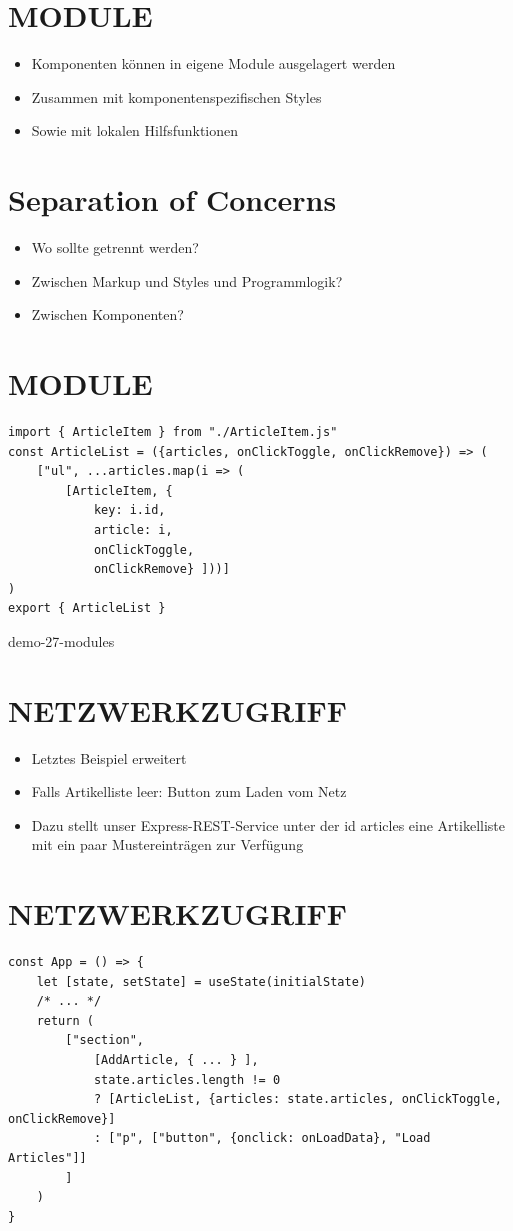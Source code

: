 \section*{MODULE}
\begin{itemize}
  \item Komponenten können in eigene Module ausgelagert werden
  \item Zusammen mit komponentenspezifischen Styles
  \item Sowie mit lokalen Hilfsfunktionen
\end{itemize}

\section*{Separation of Concerns}
\begin{itemize}
  \item Wo sollte getrennt werden?
  \item Zwischen Markup und Styles und Programmlogik?
  \item Zwischen Komponenten?
\end{itemize}

\section*{MODULE}
\begin{verbatim}
import { ArticleItem } from "./ArticleItem.js"
const ArticleList = ({articles, onClickToggle, onClickRemove}) => (
    ["ul", ...articles.map(i => (
        [ArticleItem, {
            key: i.id,
            article: i,
            onClickToggle,
            onClickRemove} ]))]
)
export { ArticleList }
\end{verbatim}

demo-27-modules

\section*{NETZWERKZUGRIFF}
\begin{itemize}
  \item Letztes Beispiel erweitert
  \item Falls Artikelliste leer: Button zum Laden vom Netz
  \item Dazu stellt unser Express-REST-Service unter der id articles eine Artikelliste mit ein paar Mustereinträgen zur Verfügung
\end{itemize}

\section*{NETZWERKZUGRIFF}
\begin{verbatim}
const App = () => {
    let [state, setState] = useState(initialState)
    /* ... */
    return (
        ["section",
            [AddArticle, { ... } ],
            state.articles.length != 0
            ? [ArticleList, {articles: state.articles, onClickToggle, onClickRemove}]
            : ["p", ["button", {onclick: onLoadData}, "Load Articles"]]
        ]
    )
}
\end{verbatim}

